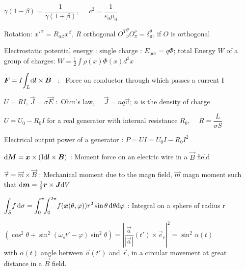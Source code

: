 \begin{squishlist}
\item $\gamma(1-\beta) = \dfrac{1}{\gamma(1+\beta)}, \quad  \,\, c^2 = \dfrac{1}{\varepsilon_0\mu_0}$
\item Rotation: $x'^\alpha=R_{\alpha \beta}x^\beta$, $R$ orthogonal \squishsep ${O^T}^{\theta}_{\nu} O^{\nu}_{\pi} = \delta^{\theta}_{\pi}$, if $O$ is orthogonal

\item Electrostatic potential energy : single charge : $E_{\text{pot}} = q\Phi$; total Energy $W$ of a group of charges: $W=\frac{1}{2}\int\rho(x)\Phi(x)d^3x$

 
\item $\mbox{\boldmath$F$} = I \displaystyle{\int_L} \mbox{\boldmath$\textrm{d} l$} \times \mbox{\boldmath$B$}$ \, : \, Force on conductor through which passes a current I

\item $U = R I$, $\vec{J} = \sigma\vec{E}$ :\, Ohm's law, $\quad \vec{J} = nq\vec{v}$; $n$ is the density of charge%

\item $U = U_0 - R_0I$ for a real generator with internal resistance $R_0$, $\quad R = \dfrac{L}{\sigma S}$ 

\item Electrical output power of a generator : $P = UI = U_0I - R_0I^2$ %

\item$\mbox{\boldmath$\textrm{d} M$} = \mbox{\boldmath$x$} \times (\rm{I}\mbox{\boldmath$\textrm{d} l$} \times \mbox{\boldmath$B$})$ : Moment force  on an electric wire in a $\vec{B}$ field

\item$\vec{\tau}=\vec{m} \times \vec{B}$ : Mechanical moment due to the magn field, $\vec{m}$ magn moment such that $\mbox{\boldmath$\textrm{d} m$}=\frac{1}{2}\mbox{\boldmath$r$} \times \mbox{\boldmath$J$} \textrm{d} V$

\item$\displaystyle{\int_{S}} f \, \textrm{d} \sigma = \displaystyle{\int_0^{\pi}} \! \displaystyle{\int_0^{2\pi}} f(\mbox{\boldmath$x$}(\theta, \varphi)) r^2\sin\theta \, \textrm{d} \theta\textrm{d} \varphi$ : Integral on a sphere of radius r

\item $\left(\cos^2\theta + \sin^2(\omega_st' - \varphi)\sin^2\theta\right) = \left| \dfrac{\vec{a}}{|\vec{a}|}(t') \times \vec{e}_r \right|^2 =  \sin^2\alpha(t)$ \\
with $\alpha(t)$ angle between $\vec{a}(t')$ and $\vec{r}$, in a circular movement at great distance in a $\vec{B}$ field.%


\end{squishlist}
